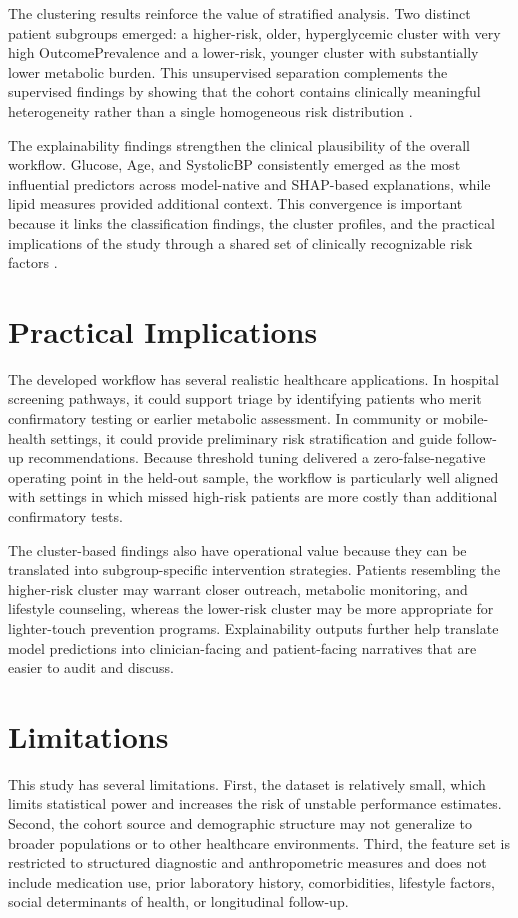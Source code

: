 \documentclass[conference]{IEEEtran}
\begin{document}
The clustering results reinforce the value of stratified analysis. Two distinct patient subgroups emerged: a higher-risk, older, hyperglycemic cluster with very high OutcomePrevalence and a lower-risk, younger cluster with substantially lower metabolic burden. This unsupervised separation complements the supervised findings by showing that the cohort contains clinically meaningful heterogeneity rather than a single homogeneous risk distribution \cite{cluster_diabetes}.

The explainability findings strengthen the clinical plausibility of the overall workflow. Glucose, Age, and SystolicBP consistently emerged as the most influential predictors across model-native and SHAP-based explanations, while lipid measures provided additional context. This convergence is important because it links the classification findings, the cluster profiles, and the practical implications of the study through a shared set of clinically recognizable risk factors \cite{xai_healthcare,xai_shap,xai_ehr}.

\section{Practical Implications}
The developed workflow has several realistic healthcare applications. In hospital screening pathways, it could support triage by identifying patients who merit confirmatory testing or earlier metabolic assessment. In community or mobile-health settings, it could provide preliminary risk stratification and guide follow-up recommendations. Because threshold tuning delivered a zero-false-negative operating point in the held-out sample, the workflow is particularly well aligned with settings in which missed high-risk patients are more costly than additional confirmatory tests.

The cluster-based findings also have operational value because they can be translated into subgroup-specific intervention strategies. Patients resembling the higher-risk cluster may warrant closer outreach, metabolic monitoring, and lifestyle counseling, whereas the lower-risk cluster may be more appropriate for lighter-touch prevention programs. Explainability outputs further help translate model predictions into clinician-facing and patient-facing narratives that are easier to audit and discuss.

\section{Limitations}
This study has several limitations. First, the dataset is relatively small, which limits statistical power and increases the risk of unstable performance estimates. Second, the cohort source and demographic structure may not generalize to broader populations or to other healthcare environments. Third, the feature set is restricted to structured diagnostic and anthropometric measures and does not include medication use, prior laboratory history, comorbidities, lifestyle factors, social determinants of health, or longitudinal follow-up.
\end{document}
